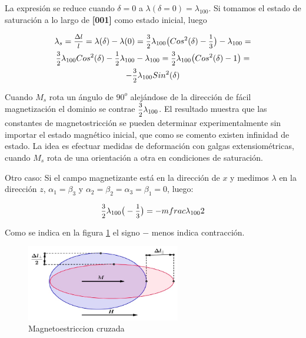 La expresión se reduce cuando $\delta=0$ a ${\lambda(\delta = 0) = \lambda_{100}}$. Si tomamos el estado de saturación a lo largo de \textbf{[001]} como estado inicial, luego


\begin{multline}
\lambda_{s} = \mfrac{\Delta l}{l}=\lambda(\delta)-\lambda(0)= \mfrac{3}{2}\lambda_{100} \big( Cos^{2}(\delta)-\mfrac{1}{3} \big) - \lambda_{100} = \\
\mfrac{3}{2}\lambda_{100} Cos^{2}(\delta)- \mfrac{1}{2}\lambda_{100} - \lambda_{100} =
\mfrac{3}{2}\lambda_{100} \big( Cos^{2}(\delta)- 1 \big) = \\
-\mfrac{3}{2}\lambda_{100} Sin^{2}(\delta)
\end{multline}


Cuando $M_{s}$ rota un ángulo de $90^{o}$ alejándose de la dirección de fácil magnetización el dominio se contrae $\mfrac{3}{2}\lambda_{100}$. El resultado muestra que las constantes de magnetostricción se pueden determinar experimentalmente sin importar el estado magnético inicial, que como se comento existen infinidad de estado. La idea es efectuar medidas de deformación con galgas extensiométricas, cuando $M_{s}$ rota de una
orientación a otra en condiciones de saturación.



Otro caso: Si el campo magnetizante está en la dirección de $x$ y medimos $\lambda$ en la dirección $z$, ${\alpha_{1} = \beta_{3}}$ y ${\alpha_{2} = \beta_{2} = \alpha_{3} = \beta_{1} = 0}$, luego:

\begin{equation}
\mfrac{3}{2}\lambda_{100}\big(-\mfrac{1}{3}\big) = - mfrac{\lambda_{100}}{2}
\end{equation}


Como se indica en la figura \ref{fig:magnetoestriccionOtroCaso} el signo $-$ menos indica contracción.

\begin{figure}[H]
    \centering
    \includegraphics[width=0.6\textwidth]{./Figures/magnetoestriccionOtroCaso}
	\caption{Magnetoestriccion cruzada}
	\label{fig:magnetoestriccionOtroCaso}
\end{figure}



